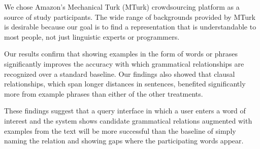 We chose Amazon's Mechanical Turk (MTurk) crowdsourcing platform as a source of study participants. The wide range of backgrounds provided by MTurk is desirable because our goal is to find a representation that is understandable to most people, not just linguistic experts or programmers.

Our results confirm that showing examples in the form of words or phrases significantly improves the accuracy with which grammatical relationships are recognized over a standard baseline.  Our findings also showed that clausal relationships, which span longer distances in sentences, benefited significantly more from example phrases than either of the other treatments.

These findings suggest that a query interface in which a user enters a word of interest and the system shows candidate grammatical relations augmented with examples from the text will be more successful than the baseline of simply naming the relation and showing gaps where the participating words appear.

